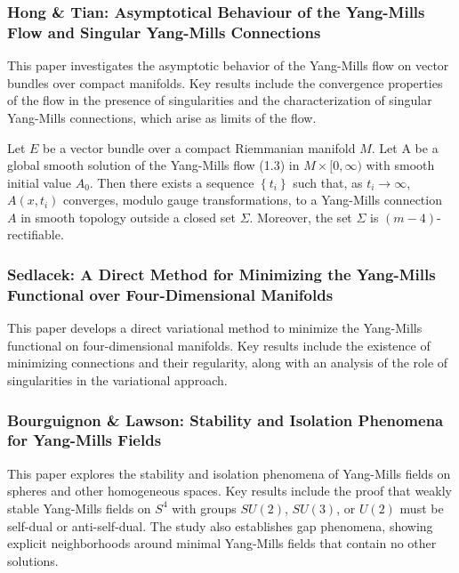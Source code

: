 \documentclass[10pt, letterpaper]{article}
\begin{document}
\subsubsection{Hong \& Tian: Asymptotical Behaviour of the Yang-Mills Flow and Singular Yang-Mills Connections \cite{hongtian2004yangmills}} 
This paper investigates the asymptotic behavior of the Yang-Mills flow on vector bundles over compact manifolds. Key results include the convergence properties of the flow in the presence of singularities and the characterization of singular Yang-Mills connections, which arise as limits of the flow.


\begin{theorem}[Theorem A.]
    Let $E$ be a vector bundle over a compact Riemmanian manifold $M$. Let A be a global smooth solution of the Yang-Mills flow (1.3) in $M \times[0, \infty)$ with smooth initial value $A_0$. Then there exists a sequence $\left\{t_i\right\}$ such that, as $t_i \rightarrow \infty$, $A\left(x, t_i\right)$ converges, modulo gauge transformations, to a Yang-Mills connection $A$ in smooth topology outside a closed set $\Sigma$. Moreover, the set $\Sigma$ is $(m-4)$-rectifiable.
\end{theorem}



\subsubsection{Sedlacek: A Direct Method for Minimizing the Yang-Mills Functional over Four-Dimensional Manifolds \cite{sedlacek1982direct}} 
This paper develops a direct variational method to minimize the Yang-Mills functional on four-dimensional manifolds. Key results include the existence of minimizing connections and their regularity, along with an analysis of the role of singularities in the variational approach.


\subsubsection{Bourguignon \& Lawson: Stability and Isolation Phenomena for Yang-Mills Fields \cite{bourguignon1981stability}} 
This paper explores the stability and isolation phenomena of Yang-Mills fields on spheres and other homogeneous spaces. Key results include the proof that weakly stable Yang-Mills fields on \( S^4 \) with groups \( SU(2) \), \( SU(3) \), or \( U(2) \) must be self-dual or anti-self-dual. The study also establishes gap phenomena, showing explicit neighborhoods around minimal Yang-Mills fields that contain no other solutions.
\end{document}
